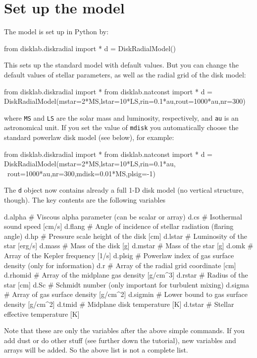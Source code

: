 \documentclass{book}
\newcommand{\code}[1]{{\small\tt #1}}
\begin{document}
\section{Set up the model}
The model is set up in Python by:
\begin{codebox}
from disklab.diskradial import *
d = DiskRadialModel()
\end{codebox}
This sets up the standard model with default values. But you can change the
default values of stellar parameters, as well as the radial grid of the disk model:
\begin{codebox}
from disklab.diskradial import *
from disklab.natconst import *
d = DiskRadialModel(mstar=2*MS,lstar=10*LS,rin=0.1*au,rout=1000*au,nr=300)
\end{codebox}
where \code{MS} and \code{LS} are the solar mass and luminosity, respectively,
and \code{au} is an astronomical unit.  If you set the value of \code{mdisk} you
automatically choose the standard powerlaw disk model (see below), for example:
\begin{codebox}
from disklab.diskradial import *
from disklab.natconst import *
d = DiskRadialModel(mstar=2*MS,lstar=10*LS,rin=0.1*au, \
              rout=1000*au,nr=300,mdisk=0.01*MS,plsig=-1)
\end{codebox}
The \code{d} object now contains already a full 1-D disk model (no vertical
structure, though). The key contents are the following variables
\begin{codebox}
d.alpha     # Viscous alpha parameter (can be scalar or array)
d.cs        # Isothermal sound speed [cm/s]
d.flang     # Angle of incidence of stellar radiation (flaring angle)
d.hp        # Pressure scale height of the disk [cm]
d.lstar     # Luminosity of the star [erg/s]
d.mass      # Mass of the disk [g]
d.mstar     # Mass of the star [g]
d.omk       # Array of the Kepler frequency [1/s]
d.plsig     # Powerlaw index of gas surface density (only for information)
d.r         # Array of the radial grid coordinate [cm]
d.rhomid    # Array of the midplane gas density [g/cm^3]
d.rstar     # Radius of the star [cm]
d.Sc        # Schmidt number (only important for turbulent mixing)
d.sigma     # Array of gas surface density [g/cm^2]
d.sigmin    # Lower bound to gas surface density [g/cm^2]
d.tmid      # Midplane disk temperature [K]
d.tstar     # Stellar effective temperature [K]
\end{codebox}
Note that these are only the variables after the above simple commands. If you
add dust or do other stuff (see further down the tutorial), new variables and
arrays will be added. So the above list is not a complete list.
\end{document}
